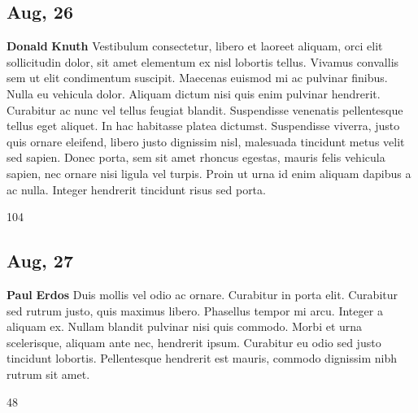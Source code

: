 \documentclass[12pt,a4paper]{article}
\begin{document}
\subsection{ Aug, 26 }
 \textbf{Donald} 
 \textbf{Knuth} 
 Vestibulum consectetur, libero et laoreet aliquam, orci elit sollicitudin dolor, sit amet elementum ex nisl lobortis tellus. Vivamus convallis sem ut elit condimentum suscipit. Maecenas euismod mi ac pulvinar finibus. Nulla eu vehicula dolor. Aliquam dictum nisi quis enim pulvinar hendrerit. Curabitur ac nunc vel tellus feugiat blandit. Suspendisse venenatis pellentesque tellus eget aliquet. In hac habitasse platea dictumst. Suspendisse viverra, justo quis ornare eleifend, libero justo dignissim nisl, malesuada tincidunt metus velit sed sapien. Donec porta, sem sit amet rhoncus egestas, mauris felis vehicula sapien, nec ornare nisi ligula vel turpis. Proin ut urna id enim aliquam dapibus a ac nulla. Integer hendrerit tincidunt risus sed porta. 


104 

\subsection{ Aug, 27 }
 \textbf{Paul} 
 \textbf{Erdos} 
 Duis mollis vel odio ac ornare. Curabitur in porta elit. Curabitur sed rutrum justo, quis maximus libero. Phasellus tempor mi arcu. Integer a aliquam ex. Nullam blandit pulvinar nisi quis commodo. Morbi et urna scelerisque, aliquam ante nec, hendrerit ipsum. Curabitur eu odio sed justo tincidunt lobortis. Pellentesque hendrerit est mauris, commodo dignissim nibh rutrum sit amet. 


48 
\end{document}

